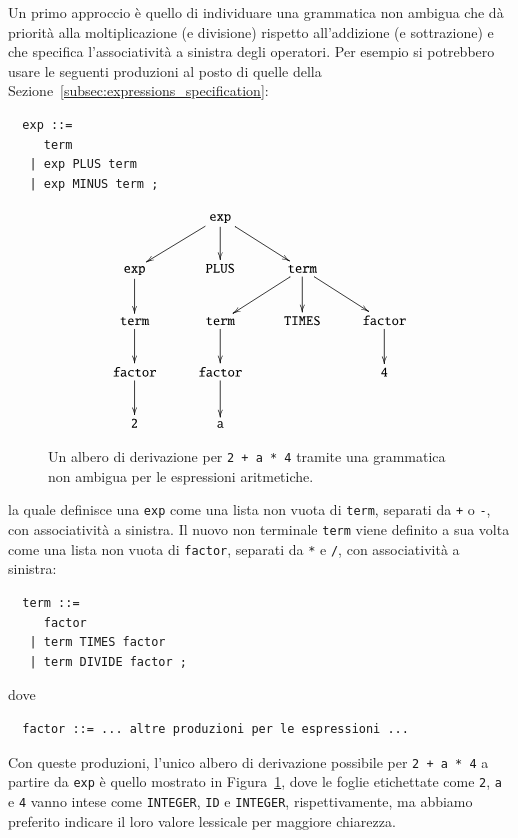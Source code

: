 Un primo approccio \`e quello di individuare una grammatica non
ambigua che d\`a priorit\`a alla moltiplicazione (e divisione) rispetto
all'addizione (e sottrazione) e che specifica l'associativit\`a a sinistra
degli operatori. Per esempio si potrebbero usare le seguenti produzioni
al posto di quelle della Sezione~\ref{subsec:expressions_specification}:
%
\begin{verbatim}
  exp ::=
     term
   | exp PLUS term
   | exp MINUS term ;
\end{verbatim}
%
\begin{figure}[t]
\[
  \xymatrix{
    & \mathtt{exp}\ar[ld]\ar[d]\ar[rd] \\
  \mathtt{exp}\ar[d] & \mathtt{PLUS} & \mathtt{term}\ar[ld]\ar[d]\ar[rd]\\
  \mathtt{term}\ar[d] & \mathtt{term}\ar[d] &
    \mathtt{TIMES} & \mathtt{factor}\ar[d] \\
  \mathtt{factor}\ar[d] & \mathtt{factor}\ar[d] & & \mathtt{4}\\
  \mathtt{2} & \mathtt{a}\\
  }
\]
\caption{Un albero di derivazione per \texttt{2 + a * 4} tramite una grammatica non ambigua per le espressioni aritmetiche.}
  \label{fig:no_ambiguity}
\end{figure}
%
la quale definisce una \texttt{exp} come una lista non vuota di \texttt{term},
separati da \texttt{+} o \texttt{-}, con associativit\`a a sinistra.
Il nuovo non terminale \texttt{term} viene definito a sua volta come una
lista non vuota di \texttt{factor}, separati da \texttt{*} e \texttt{/},
con associativit\`a a sinistra:
%
\begin{verbatim}
  term ::=
     factor
   | term TIMES factor
   | term DIVIDE factor ;
\end{verbatim}
%
dove
%
\begin{verbatim}
  factor ::= ... altre produzioni per le espressioni ...
\end{verbatim}
%
Con queste produzioni, l'unico albero di derivazione possibile
per \texttt{2 + a * 4} a partire da \texttt{exp} \`e quello mostrato
in Figura~\ref{fig:no_ambiguity}, dove le foglie etichettate come
\texttt{2}, \texttt{a} e \texttt{4} vanno intese come \texttt{INTEGER},
\texttt{ID} e \texttt{INTEGER}, rispettivamente, ma abbiamo preferito
indicare il loro valore lessicale per maggiore chiarezza.

